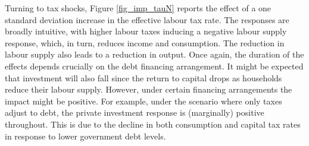 \documentclass[a4paper,11pt]{article}
\numberwithin{equation}{section}
\begin{document}
	\newpage
	\begin{minipage}{\linewidth}
	\end{minipage}
	
	Turning to tax shocks, Figure \ref{fig_imp_tauN} reports the effect of a one standard deviation increase in the effective labour tax rate. The responses are broadly intuitive, with higher labour taxes inducing a negative labour supply response, which, in turn, reduces income and consumption. The reduction in labour supply also leads to a reduction in output. Once again, the duration of the effects depends crucially on the debt financing arrangement. It might be expected that investment will also fall since the return to capital drops as households reduce their labour supply. However, under certain financing arrangements the impact might be positive. For example, under the scenario where only taxes adjust to debt, the private investment response is (marginally) positive throughout. This is due to the decline in both consumption and capital tax rates in response to lower government debt levels. 
	
\end{document}
